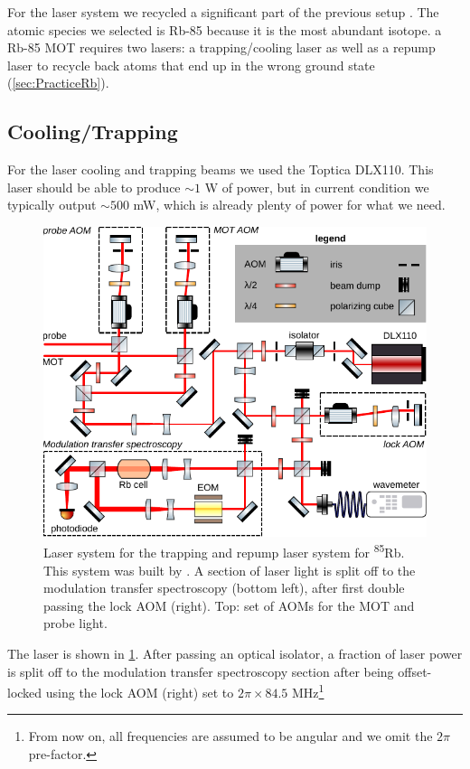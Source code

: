 For the laser system we recycled a significant part of the previous setup \cite{Reijnders2010}.
The atomic species we selected is Rb-85 because it is the most abundant isotope. 
a Rb-85 MOT requires two lasers: a trapping/cooling laser as well as a repump laser to recycle back atoms that end up in the wrong ground state (\cref{sec:PracticeRb}).

\subsection{Cooling/Trapping}

For the laser cooling and trapping beams we used the Toptica DLX110.
This laser should be able to produce $\sim 1$ W of power, but in current condition we typically output $\sim 500$ mW, which is already plenty of power for what we need. 
\begin{figure}[t]
    \centering
    \includegraphics[width=\linewidth]{figures/RbLaserSetup.pdf}
    \caption{Laser system for the trapping and repump laser system for \textsuperscript{85}Rb.
    This system was built by \cite{Reijnders2010}.
    A section of laser light is split off to the modulation transfer spectroscopy (bottom left), after first double passing the lock \ac{AOM} (right). 
    Top: set of AOMs for the MOT and probe light.
    }
    \label{fig:RbLaserSetup}
\end{figure}
The laser is shown in \cref{fig:RbLaserSetup}.
After passing an optical isolator, a fraction of laser power is split off to the modulation transfer spectroscopy section after being offset-locked using the lock \ac{AOM} (right) set to $2\pi \times  84.5$ MHz\footnote{From now on, all frequencies are assumed to be angular and we omit the $2\pi$ pre-factor.}
